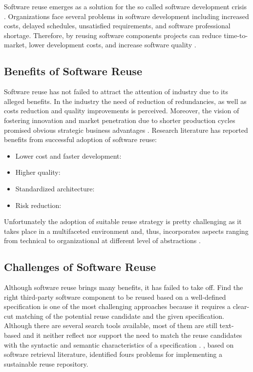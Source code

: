 Software reuse emerges as a solution for the so called software development crisis \cite{Kim1992}. Organizations face several problems in software development including increased costs, delayed schedules, unsatisfied requirements, and software professional shortage. Therefore, by reusing software components projects can reduce time-to-market, lower development costs, and increase software quality \cite{Frakes2005}.

\subsection{Benefits of Software Reuse}
Software reuse has not failed to attract the attention of industry due to its alleged benefits. In the industry the need of reduction of redundancies, as well as costs reduction and quality improvements is perceived. Moreover, the vision of fostering innovation and market penetration due to shorter production cycles promised obvious strategic business advantages \cite{Bauer2016}. Research literature has reported benefits from successful adoption of software reuse:

\begin{itemize}
\item Lower cost and faster development:
\item Higher quality:
\item Standardized architecture:
\item Risk reduction: 
\end{itemize}

Unfortunately the adoption of suitable reuse strategy is pretty challenging as it takes place in a multifaceted environment and, thus, incorporates aspects ranging from technical to organizational at different level of abstractions \cite{Bauer2016}.

\subsection{Challenges of Software Reuse}
\label{sec:sw-challenges}
Although software reuse brings many benefits, it has failed to take off. Find the right third-party software component to be reused based on a well-defined specification is one of the most challenging approaches because it requires a clear-cut matching of the potential reuse candidate and the given specification. Although there are several search tools available, most of them are still text-based and it neither reflect nor support the need to match the reuse candidates with the syntactic and semantic characteristics of a specification \cite{Hummel2013}. \cite{Hummel2013}, based on software retrieval literature, identified fours problems for implementing a sustainable reuse repository.

